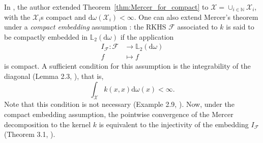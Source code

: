 \documentclass[twoside,11pt]{book}
\newtheorem{theorem}{Theorem}
\numberwithin{theorem}{chapter}
\numberwithin{definition}{chapter}
\numberwithin{proposition}{chapter}
\numberwithin{corollary}{chapter}
\numberwithin{example}{chapter}
\numberwithin{lemma}{chapter}
\numberwithin{assumption}{chapter}
\begin{document}
In \cite{Sun05}, the author extended Theorem~\ref{thm:Mercer_for_compact} to $\mathcal{X} = \cup_{i \in \mathbb{N}} \mathcal{X}_{i}$, with the $\mathcal{X}_{i}$s compact and $\mathrm{d}\omega(\mathcal{X}_{i})<\infty$. One can also extend Mercer's theorem under a \textit{compact embedding} assumption \citep{StSc12}: the RKHS $\mathcal{F}$ associated to $k$ is said to be compactly embedded in $\mathbb{L}_{2}(\mathrm{d}\omega)$ if the application
\begin{align*}
  I_{\mathcal{F}}: \mathcal{F}&\longrightarrow \mathbb{L}_{2}(\mathrm{d}\omega) \\
  f &\longmapsto f
\end{align*}
is compact.
A sufficient condition for this assumption is the integrability of the diagonal (Lemma 2.3, \citep{StSc12}), that is,
\begin{equation}
\int_{\mathcal{X}} k(x,x) \mathrm{d}\omega(x) < \infty.
\end{equation}
Note that this condition is not necessary (Example 2.9, \citep{StSc12}). Now, under the compact embedding assumption, the pointwise convergence of the Mercer decomposition to the kernel $k$ is equivalent to the injectivity of the embedding $I_{\mathcal{F}}$ (Theorem 3.1, \citep{StSc12}).
\end{document}
